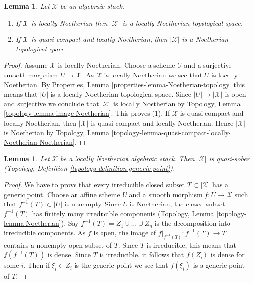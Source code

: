 \documentclass{stacks-project}
\theoremstyle{plain}
\newtheorem{lemma}[subsection]{Lemma}
\theoremstyle{definition}
\theoremstyle{remark}
\numberwithin{equation}{subsection}
\begin{document}
\begin{lemma}
\label{lemma-Noetherian-topology}
Let $\mathcal{X}$ be an algebraic stack.
\begin{enumerate}
\item If $\mathcal{X}$ is locally Noetherian then $|\mathcal{X}|$
is a locally Noetherian topological space.
\item If $\mathcal{X}$ is quasi-compact and locally Noetherian, then
$|\mathcal{X}|$ is a Noetherian topological space.
\end{enumerate}
\end{lemma}

\begin{proof}
Assume $\mathcal{X}$ is locally Noetherian.
Choose a scheme $U$ and a surjective smooth morphism
$U \to \mathcal{X}$. As $\mathcal{X}$ is locally Noetherian
we see that $U$ is locally Noetherian. By
Properties, Lemma \ref{properties-lemma-Noetherian-topology}
this means that $|U|$ is a locally Noetherian topological space.
Since $|U| \to |\mathcal{X}|$ is open and surjective we conclude that
$|\mathcal{X}|$ is locally Noetherian by
Topology, Lemma \ref{topology-lemma-image-Noetherian}.
This proves (1). If $\mathcal{X}$ is quasi-compact and locally Noetherian,
then $|\mathcal{X}|$ is quasi-compact and locally Noetherian. Hence
$|\mathcal{X}|$ is Noetherian by Topology, Lemma
\ref{topology-lemma-quasi-compact-locally-Noetherian-Noetherian}.
\end{proof}

\begin{lemma}
\label{lemma-locally-Noetherian-quasi-sober}
Let $\mathcal{X}$ be a locally Noetherian algebraic stack.
Then $|\mathcal{X}|$ is quasi-sober (Topology, Definition
\ref{topology-definition-generic-point}).
\end{lemma}

\begin{proof}
We have to prove that every
irreducible closed subset $T \subset |\mathcal{X}|$ has a generic point.
Choose an affine scheme $U$ and a smooth morphism $f : U \to \mathcal{X}$
such that $f^{-1}(T) \subset |U|$ is nonempty. Since $U$ is Noetherian,
the closed subset $f^{-1}(T)$ has finitely many irreducible components
(Topology, Lemma \ref{topology-lemma-Noetherian}).
Say $f^{-1}(T) = Z_1 \cup \ldots \cup Z_n$ is the decomposition into
irreducible components. As $f$ is open, the image of
$f|_{f^{-1}(T)} : f^{-1}(T) \to T$ contains a nonempty open subset of $T$.
Since $T$ is irreducible, this means that $f(f^{-1}(T))$ is dense.
Since $T$ is irreducible, it follows that $f(Z_i)$ is dense for some $i$.
Then if $\xi_i \in Z_i$ is the generic point we see that
$f(\xi_i)$ is a generic point of $T$.
\end{proof}
\end{document}
